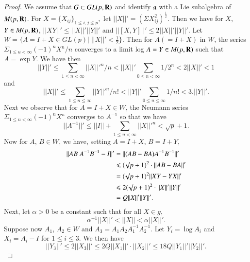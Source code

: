 \begin{proof}
We assume that $G \subset G L (p, \mathbf{R})$ and identify $\mathfrak{g}$ with a Lie subalgebra of $M(p,\mathbf{R})$. For $X = \{X_{ij}\}_{1 \leqslant i, j \leqslant p},$ let $||X||' = (\Sigma X^2_{ij})^{\frac{1}{2}}$. Then we have for $X$, $Y \in M (p, \mathbf{R})$, $||XY||' \leqslant ||X||' ||Y ||'$ and $||[X,Y]||'\leqslant 2 ||X||' ||Y||'$. Let $W = \{A = I + X \in G L (p) \big| \; ||X||' < \frac{1}{2}\}$. Then for $A (= I + X)$ in $W$, the series $\Sigma_{1 \leqslant u < \infty} (-1)^{n } X^n/n$ converges to a limit log $A = Y \in M (p,\mathbf{R})$ such that $A = \exp Y$. We have then
\begin{equation}
||Y||' \leqslant \sum\limits_{1 \leqslant n < \infty} ||X||'^{n}/n < ||X||' \sum\limits_{0 \leqslant n < \infty} 1/ 2^n < 2 ||X||' < 1 \label{art9-eq1}
\end{equation}
and
\begin{equation}
||X||'  \leqslant \sum\limits_{1 \leqslant n \leqslant \infty} ||Y||'^n/n ! < ||Y ||' \sum\limits_{0 \leqslant n \leqslant \infty} 1/n ! < 3. ||Y||'. \label{art9-eq2}
\end{equation}
Next we observe that for $A = I + X \in W$, the Neumann series $\Sigma_{1 \leqslant n < \infty} (-1)^n X^n$ converges to $A^{-1}$ so that we have
\begin{equation}
||A^{-1}||'\leqslant ||I || + \sum\limits_{1 \leqslant n < \infty} ||X||'^n < \surd p + 1 . \label{art9-eq3}
\end{equation}
Now for $A$, $B \in W$, we have, setting $A = I + X$, $B = I + Y$,
\begin{align}
||AB \; A^{-1} B^{-1} - I ||' & = ||(AB - BA) A^{-1} B^{-1}||'\label{art9-eq4}\\
& \leqslant (\surd p +1)^2 \cdot ||AB - BA||'\notag\\
& = (\surd p + 1)^2 || XY - YX||'\notag\\
& \leqslant 2 (\surd p + 1)^2 \cdot ||X||' ||Y||'\notag\\
& = Q ||X ||' ||Y||'. \notag
\end{align}\pageoriginale
Next, let $\alpha >0$ be a constant such that for all $X \in g$,
\begin{equation}
\alpha^{-1} ||X||' < ||X|| < \alpha ||X||'. \label{art9-eq5}
\end{equation}
Suppose now $A_1$, $A_2 \in W$ and $A_3 = A_1 A_2 A^{-1}_1 A^{-1}_2$. Let $Y_i = \log A_i$ and $X_i = A_i -I$ for $1 \leqslant  i \leqslant 3$. We then have
\begin{equation}
||Y_3||' \leqslant 2 ||X_3||' \leqslant 2 Q ||X_1||' \cdot ||X_2 ||' \leqslant 18 Q ||Y_1||' ||Y_2||'. \label{art9-eq6}

\end{equation}
\end{proof}
